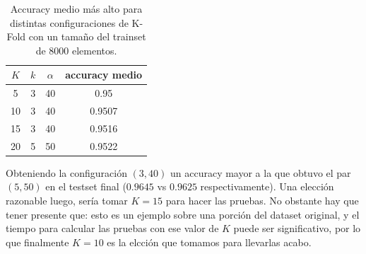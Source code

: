 \begin{table}[h!]
    \begin{center}
        \begin{tabular}{|c|c|c|c|}
        \hline
        \textbf{$K$} & \textbf{$k$} & \textbf{$\alpha$} & \textbf{accuracy medio} \\
        \hline
        5 & 3 & 40 & 0.95\\
        10 & 3 & 40 & 0.9507\\
        15 & 3 & 40 & 0.9516\\
        20 & 5 & 50 & 0.9522\\
        \hline
        \end{tabular}
        \caption{Accuracy medio más alto para distintas configuraciones de K-Fold con un tamaño del trainset de 8000 elementos.}
        \label{kfold_table_1}
    \end{center}
\end{table}

Obteniendo la configuración $(3, 40)$ un accuracy mayor a la que obtuvo el par $(5, 50)$ en el testset final ($0.9645$ vs $0.9625$ respectivamente). Una elección razonable luego, sería tomar $K=15$ para hacer las pruebas. No obstante hay que tener presente que: esto es un ejemplo sobre una porción del dataset original, y el tiempo para calcular las pruebas con ese valor de $K$ puede ser significativo, por lo que finalmente $K=10$ es la elcción que tomamos para llevarlas acabo.